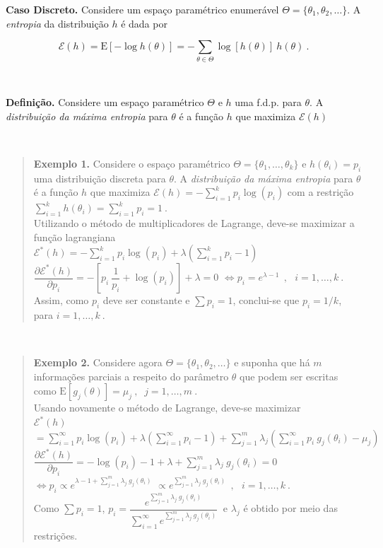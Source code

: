 \documentclass[
]{book}
\begin{document}
\textbf{Caso Discreto.} Considere um espaço paramétrico enumerável \(\Theta = \{\theta_1,\theta_2,\ldots\}\). A \emph{entropia} da distribuição \(h\) \citep{Shannon48} é dada por

\[\mathcal{E}(h)=\text{E}[-\log h(\theta)]=\displaystyle-\sum_{\theta\in\Theta} \log\left[h(\theta)\right]~h(\theta)~.\]

\(~\)

\textbf{Definição.} Considere um espaço paramétrico \(\Theta\) e \(h\) uma f.d.p. para \(\theta\). A \emph{distribuição da máxima entropia} para \(\theta\) é a função \(h\) que maximiza \(\mathcal{E}(h)\) \citep{Jaynes03}

\(~\)

\begin{quote}
\textbf{Exemplo 1.} Considere o espaço paramétrico \(\Theta=\{\theta_1,\ldots,\theta_k\}\) e \(h(\theta_i)=p_i\) uma distribuição discreta para \(\theta\). A \emph{distribuição da máxima entropia} para \(\theta\) é a função \(h\) que maximiza \(\mathcal{E}(h)=-\displaystyle\sum_{i=1}^{k} p_i\log(p_i)\) com a restrição \(\displaystyle\sum_{i=1}^k h(\theta_i)=\sum_{i=1}^k p_i=1~.\)\\
Utilizando o método de multiplicadores de Lagrange, deve-se maximizar a função lagrangiana\\
\(\mathcal{E}^*(h)=\displaystyle-\sum_{i=1}^k p_i\log(p_i)+\lambda\left(\sum_{i=1}^k p_i-1\right)\)\\
\(\dfrac{\partial\mathcal{E}^*(h)}{\partial p_i}=-\left[p_i~\dfrac{1}{p_i}+\log(p_i)\right]+\lambda=0\) \(\Longleftrightarrow p_i = e^{\lambda-1}~~,~~~i=1,\ldots,k~.\)\\
Assim, como \(p_i\) deve ser constante e \(\sum p_i=1\), conclui-se que \(p_i=1/k\), para \(i=1,\ldots,k~.\)
\end{quote}

\(~\)

\begin{quote}
\textbf{Exemplo 2.} Considere agora \(\Theta = \{\theta_1,\theta_2,\ldots\}\) e suponha que há \(m\) informações parciais a respeito do parâmetro \(\theta\) que podem ser escritas como \(\text{E}[g_j(\theta)]=\mu_j~,~\) \(j=1,\ldots,m~.\)\\
Usando novamente o método de Lagrange, deve-se maximizar\\
\(\mathcal{E}^*(h)\) \(=\displaystyle\sum_{i=1}^\infty p_i\log(p_i)+\lambda\left(\sum_{i=1}^\infty p_i-1\right)+ \sum_{j=1}^m\lambda_j\left(\sum_{i=1}^\infty p_i~g_j(\theta_i)-\mu_j\right)\)\\
\(\dfrac{\partial \mathcal{E}^*(h)}{\partial p_i}=\displaystyle-\log(p_i)-1+\lambda+\sum_{j=1}^m\lambda_j~g_j(\theta_i)=0\)
\(\Longleftrightarrow p_i \propto e^{\lambda-1+\sum_{j=1}^m \lambda_j~g_j(\theta_i)}\) \(\propto e^{\sum_{j=1}^m \lambda_j~g_j(\theta_i)}~~,~~~i=1,\ldots,k~.\)\\
Como \(\sum p_i=1\), \(p_i = \dfrac{e^{\sum_{j=1}^m \lambda_j~g_j(\theta_i)}}{\sum_{i=1}^\infty e^{\sum_{j=1}^m \lambda_j~g_j(\theta_i)}}~\) e \(\lambda_j\) é obtido por meio das restrições.
\end{quote}
\end{document}
